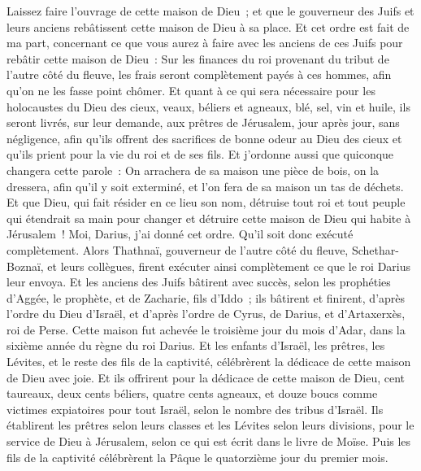 \begin{multicols}{2}
Laissez faire l'ouvrage de cette maison de Dieu~; et que le gouverneur des Juifs et leurs anciens rebâtissent cette maison de Dieu à sa place.
Et cet ordre est fait de ma part, concernant ce que vous aurez à faire avec les anciens de ces Juifs pour rebâtir cette maison de Dieu~: Sur les finances du roi provenant du tribut de l'autre côté du fleuve, les frais seront complètement payés à ces hommes, afin qu'on ne les fasse point chômer.
Et quant à ce qui sera nécessaire pour les holocaustes du Dieu des cieux, veaux, béliers et agneaux, blé, sel, vin et huile, ils seront livrés, sur leur demande, aux prêtres de Jérusalem, jour après jour, sans négligence,
afin qu'ils offrent des sacrifices de bonne odeur au Dieu des cieux et qu'ils prient pour la vie du roi et de ses fils.
Et j'ordonne aussi que quiconque changera cette parole~: On arrachera de sa maison une pièce de bois, on la dressera, afin qu'il y soit exterminé, et l'on fera de sa maison un tas de déchets.
Et que Dieu, qui fait résider en ce lieu son nom, détruise tout roi et tout peuple qui étendrait sa main pour changer et détruire cette maison de Dieu qui habite à Jérusalem~! Moi, Darius, j'ai donné cet ordre. Qu'il soit donc exécuté complètement.
Alors Thathnaï, gouverneur de l'autre côté du fleuve, Schethar-Boznaï, et leurs collègues, firent exécuter ainsi complètement ce que le roi Darius leur envoya.
Et les anciens des Juifs bâtirent avec succès, selon les prophéties d'Aggée, le prophète, et de Zacharie, fils d'Iddo~; ils bâtirent et finirent, d'après l'ordre du Dieu d'Israël, et d'après l'ordre de Cyrus, de Darius, et d'Artaxerxès, roi de Perse.
Cette maison fut achevée le troisième jour du mois d'Adar, dans la sixième année du règne du roi Darius.
Et les enfants d'Israël, les prêtres, les Lévites, et le reste des fils de la captivité, célébrèrent la dédicace de cette maison de Dieu avec joie.
Et ils offrirent pour la dédicace de cette maison de Dieu, cent taureaux, deux cents béliers, quatre cents agneaux, et douze boucs comme victimes expiatoires pour tout Israël, selon le nombre des tribus d'Israël.
Ils établirent les prêtres selon leurs classes et les Lévites selon leurs divisions, pour le service de Dieu à Jérusalem, selon ce qui est écrit dans le livre de Moïse.
Puis les fils de la captivité célébrèrent la Pâque le quatorzième jour du premier mois.

\end{multicols}
